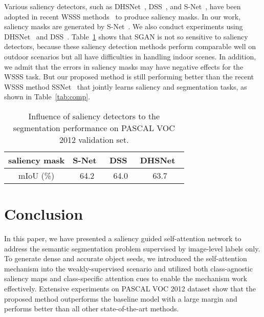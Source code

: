 \documentclass[journal]{IEEEtran}
\begin{document}
Various saliency detectors, such as DHSNet~\cite{Liu2016saliency}, DSS~\cite{hou2017deeply}, and S-Net~\cite{xiao2018deep}, have been adopted in recent WSSS methods~\cite{chaudhry2017discovering,hou2018self,wei2018revisiting} to produce saliency masks. In our work, saliency masks are generated by S-Net~\cite{xiao2018deep}. We also conduct experiments using DHSNet~\cite{Liu2016saliency} and DSS~\cite{hou2017deeply}. Table~\ref{tab:sal} shows that SGAN is not so sensitive to saliency detectors, because these saliency detection methods perform comparable well on outdoor scenarios but all have difficulties in handling indoor scenes. In addition, we admit that the errors in saliency masks may have negative effects for the WSSS task. But our proposed method is still performing better than the recent WSSS method SSNet~\cite{Zeng_2019_ICCV} that jointly learns saliency and segmentation tasks, as shown in Table~\ref{tab:comp}. 

\begin{table}[htp]
	\caption{Influence of saliency detectors to the segmentation performance on PASCAL VOC 2012 validation set.}
	\label{tab:sal}
	\centering
	\begin{tabular}{c|c|c|c}
		\hline
		saliency mask &S-Net~\cite{xiao2018deep} &DSS~\cite{hou2017deeply}  &DHSNet~\cite{Liu2016saliency} \\ \hline
		mIoU (\%)     &64.2  &64.0 &63.7 \\ \hline
	\end{tabular}
	
\end{table}



\section{Conclusion}
In this paper, we have presented a saliency guided self-attention network to address the semantic segmentation problem supervised by image-level labels only. To generate dense and accurate object seeds, we introduced the self-attention mechanism into the weakly-supervised scenario and utilized both class-agnostic saliency maps and class-specific attention cues to enable the mechanism work effectively. Extensive experiments on PASCAL VOC 2012 dataset show that the proposed method outperforms the baseline model with a large margin and performs better than all other state-of-the-art methods.




\end{document}
